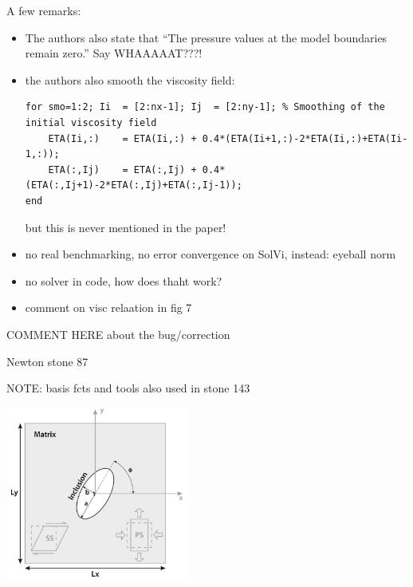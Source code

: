 A few remarks:
\begin{itemize}
\item The authors also state that ``The pressure values at the model boundaries remain zero.'' Say WHAAAAAT???!
\item the authors also smooth the viscosity field:
\begin{verbatim}
for smo=1:2; Ii  = [2:nx-1]; Ij  = [2:ny-1]; % Smoothing of the initial viscosity field
    ETA(Ii,:)    = ETA(Ii,:) + 0.4*(ETA(Ii+1,:)-2*ETA(Ii,:)+ETA(Ii-1,:));
    ETA(:,Ij)    = ETA(:,Ij) + 0.4*(ETA(:,Ij+1)-2*ETA(:,Ij)+ETA(:,Ij-1));
end
\end{verbatim}
but this is never mentioned in the paper!

\item no real benchmarking, no error convergence on SolVi, instead: eyeball norm
\item no solver in code, how does thaht work?
\item comment on visc relaation in fig 7
\end{itemize}

COMMENT HERE about the bug/correction

Newton stone 87

NOTE: basis fcts and tools also used in stone 143


\begin{center}
\includegraphics[width=6cm]{python_codes/fieldstone_142/images/hams22_a}\\
\end{center}

